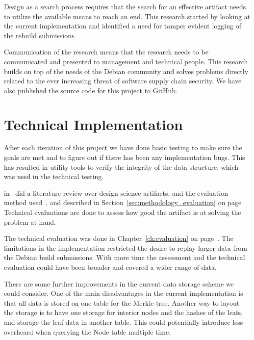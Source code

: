 \documentclass[../Main/thesis.tex]{subfiles}
\begin{document}
Design as a search process requires that the search for an effective artifact
needs to utilize the available means to reach an end. This research started by
looking at the current implementation and identified a need for tamper evident
logging of the rebuild submissions.

Communication of the research means that the research needs to be communicated
and presented to management and technical people. This research builds on top of
the needs of the Debian community and solves problems directly related to the
ever increasing threat of software supply chain security. We have also published
the source code for this project to GitHub.

\section{Technical Implementation}%
\label{sec:technical_Implementation}
After each iteration of this project we have done basic testing to make sure the
goals are met and to figure out if there has been any implementation bugs. This
has resulted in utility tools to verify the integrity of the data structure,
which was used in the technical testing.

\citeauthor{Peffers:2012:DSR:2342209.2342243}
in~ did a literature review over
design science artifacts, and the evaluation method
used~\cite{Peffers:2012:DSR:2342209.2342243}, and described in
Section~\ref{sec:methodology_evaluation} on
page~\pageref{sec:methodology_evaluation} Technical evaluations are done to
assess how good the artifact is at solving the problem at hand.

The technical evaluation was done in Chapter~\ref{ch:evaluation} on
page~\pageref{ch:evaluation}. The limitations in the implementation restricted
the desire to replay larger data from the Debian build submissions. With more
time the assessment and the technical evaluation could have been broader and
covered a wider range of data.

There are some further improvements in the current data storage scheme we could
consider. One of the main disadvantages in the current implementation is that
all data is stored on one table for the Merkle tree. Another way to layout the
storage is to have one storage for interior nodes and the hashes of the leafs,
and storage the leaf data in another table. This could potentially introduce
less overheard when querying the Node table multiple time.
\end{document}
